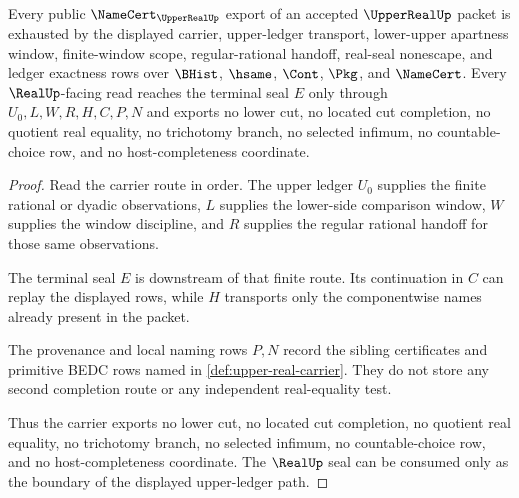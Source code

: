 \begin{theorem}
\label{thm:upper-real-public-certificate}
Every public $\NameCert_{\UpperRealUp}$ export of an accepted $\UpperRealUp$ packet is exhausted by the displayed carrier, upper-ledger transport, lower-upper apartness window, finite-window scope, regular-rational handoff, real-seal nonescape, and ledger exactness rows over $\BHist$, $\hsame$, $\Cont$, $\Pkg$, and $\NameCert$. Every $\RealUp$-facing read reaches the terminal seal $E$ only through $U_0,L,W,R,H,C,P,N$ and exports no lower cut, no located cut completion, no quotient real equality, no trichotomy branch, no selected infimum, no countable-choice row, and no host-completeness coordinate.
\end{theorem}
\begin{proof}
Read the carrier route in order. The upper ledger $U_0$ supplies the finite rational or dyadic observations, $L$ supplies the lower-side comparison window, $W$ supplies the window discipline, and $R$ supplies the regular rational handoff for those same observations.

The terminal seal $E$ is downstream of that finite route. Its continuation in $C$ can replay the displayed rows, while $H$ transports only the componentwise names already present in the packet.

The provenance and local naming rows $P,N$ record the sibling certificates and primitive BEDC rows named in \autoref{def:upper-real-carrier}. They do not store any second completion route or any independent real-equality test.

Thus the carrier exports no lower cut, no located cut completion, no quotient real equality, no trichotomy branch, no selected infimum, no countable-choice row, and no host-completeness coordinate. The $\RealUp$ seal can be consumed only as the boundary of the displayed upper-ledger path.
\end{proof}

